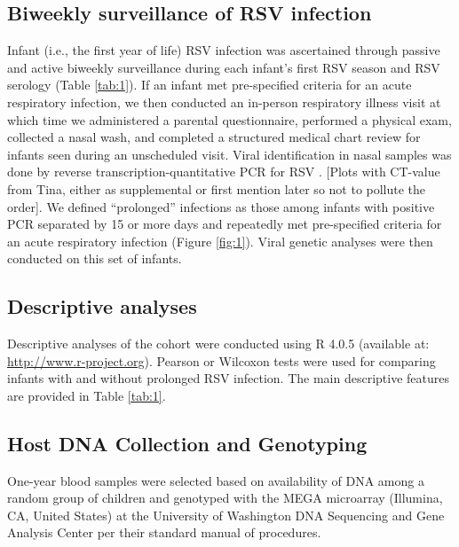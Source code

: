 \documentclass{article} %
\begin{document}
\subsection{Biweekly surveillance of RSV infection}
Infant (i.e., the first year of life) RSV infection was ascertained through passive and active biweekly surveillance during each infant's first RSV season and RSV serology
(Table \ref{tab:1}).
If an infant met pre-specified criteria for an acute respiratory infection, we then conducted an in-person respiratory illness visit at which time we administered a parental questionnaire, performed a physical exam, collected a nasal wash, and completed a structured medical chart review for infants seen during an unscheduled visit. 
Viral identification in nasal samples was done by reverse transcription-quantitative PCR for RSV
\citep{larkin2015objectives}. 
[Plots with CT-value from Tina, either as supplemental or first mention later so not to pollute the order]. 
We defined ``prolonged'' infections as those among infants with positive PCR separated by 15 or more days and repeatedly met pre-specified criteria for an acute respiratory infection 
(Figure \ref{fig:1}).
Viral genetic analyses were then conducted on this set of infants.

\subsection{Descriptive analyses}
Descriptive analyses of the cohort were conducted using R 4.0.5 (available at: 
\url{http://www.r-project.org}). 
Pearson or Wilcoxon tests were used for comparing infants with and without prolonged RSV infection.
The main descriptive features are provided in 
Table \ref{tab:1}.

\subsection{Host DNA Collection and Genotyping}
One-year blood samples were selected based on availability of DNA among a random group of children and genotyped with the MEGA microarray (Illumina, CA, United States) at the University of Washington DNA Sequencing and Gene Analysis Center per their standard manual of procedures.
\end{document}
